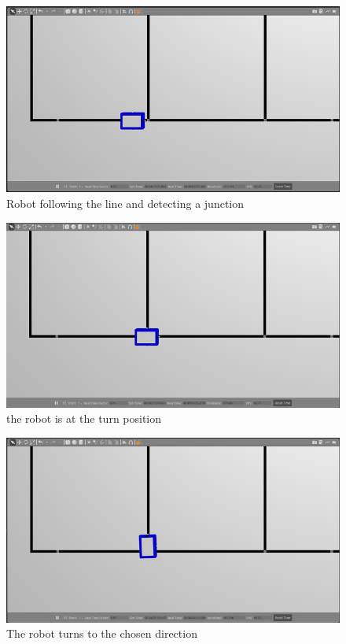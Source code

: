 \documentclass[../../main]{subfiles}
\begin{document}
\begin{figure}[h!]
  \centering
  \includegraphics[width=\textwidth]{img/image045.png}
  \caption{Robot following the line and detecting a junction}
  \label{judeFig32}
  \end{figure}
\newpage
  \begin{figure}[h!]
    \centering
    \includegraphics[width=\textwidth]{img/image047.png}
    \caption{the robot is at the turn position}
    \end{figure}

    \begin{figure}[h!]
      \centering
      \includegraphics[width=\textwidth]{img/image049.png}
      \caption{The robot turns to the chosen direction}
      \end{figure}
\end{document}
